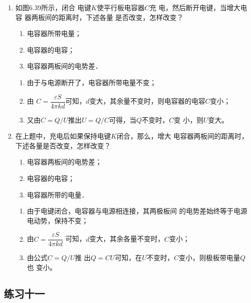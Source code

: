 \begin{enumerate}
\begin{solution}
\end{solution}

\item 如图6.39所示，闭合
电键$K$使平行板电容器$C$充
电，然后断开电键，当增大电容
器两板间的距离时，下述各量
是否改变，怎样改变？
\begin{enumerate}
	\item 电容器所带电量；
	\item 电容器的电容；
	\item 电容器两板间的电势差．
\end{enumerate}

\begin{solution}
\begin{enumerate}
    \item 由于与电源断开了，电容器所带电量不变；
    \item 由
    $C=\dfrac{\varepsilon S}{4\pi kd}$可知，$d$变大，其余量不变时，则电容器的电容$C$变小；
    \item 又由$C=Q/U$推出$U=Q/C$可得，当$Q$不变时，$C$变
    小，则$U$变大。
\end{enumerate}
\end{solution}

\item 在上题中，充电后如果保持电键$K$闭合，那么，增大
电容器两板间的距离时，下述各量是否改变，怎样改变？
\begin{enumerate}
	\item 电容器两板间的电势差；
	\item 电容器的电容；
	\item 电容器所带的电量．
\end{enumerate}

\begin{solution}
\begin{enumerate}
    \item 由于电键闭合，电容器与电源相连接，其两极板间
    的电势差始终等于电源电动势，保持不变；
    \item 由$C=\dfrac{\varepsilon S}{4\pi kd}$
    可知，$d$变大，其余各量不变时，$C$变小；
    \item 由公式$C=Q/U$推
    出$Q=CU$可知，在$U$不变时，$C$变小，则极板带电量$Q$也
    变小。
\end{enumerate}
\end{solution}

\end{enumerate}



\subsection{练习十一}

